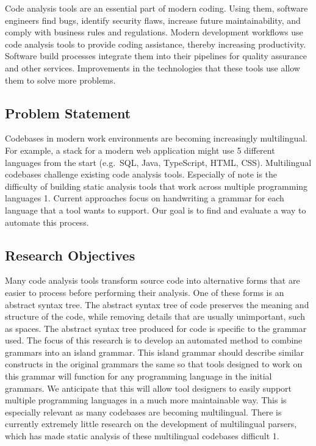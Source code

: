 \documentclass[conference,compsoc]{IEEEtran}
\begin{document}
Code analysis tools are an essential part of modern coding. Using them,
software engineers find bugs, identify security flaws, increase future
maintainability, and comply with business rules and regulations. Modern
development workflows use code analysis tools to provide coding
assistance, thereby increasing productivity. Software build processes
integrate them into their pipelines for quality assurance and other
services. Improvements in the technologies that these tools use allow
them to solve more problems.

\hypertarget{problem-statement}{%
\subsection{Problem Statement}\label{problem-statement}}

Codebases in modern work environments are becoming increasingly
multilingual. For example, a stack for a modern web application might
use 5 different languages from the start (e.g.~SQL, Java, TypeScript,
HTML, CSS). Multilingual codebases challenge existing code analysis
tools. Especially of note is the difficulty of building static analysis
tools that work across multiple programming languages 1. Current
approaches focus on handwriting a grammar for each language that a tool
wants to support. Our goal is to find and evaluate a way to automate
this process.

\hypertarget{research-objectives}{%
\subsection{Research Objectives}\label{research-objectives}}

Many code analysis tools transform source code into alternative forms
that are easier to process before performing their analysis. One of
these forms is an abstract syntax tree. The abstract syntax tree of code
preserves the meaning and structure of the code, while removing details
that are usually unimportant, such as spaces. The abstract syntax tree
produced for code is specific to the grammar used. The focus of this
research is to develop an automated method to combine grammars into an
island grammar. This island grammar should describe similar constructs
in the original grammars the same so that tools designed to work on this
grammar will function for any programming language in the initial
grammars. We anticipate that this will allow tool designers to easily
support multiple programming languages in a much more maintainable way.
This is especially relevant as many codebases are becoming multilingual.
There is currently extremely little research on the development of
multilingual parsers, which has made static analysis of these
multilingual codebases difficult 1.
\end{document}
